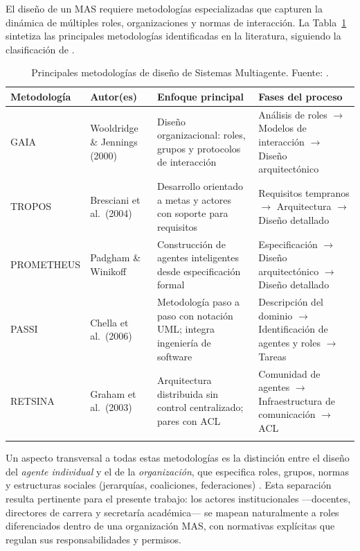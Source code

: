El diseño de un MAS requiere metodologías especializadas que capturen la dinámica de múltiples roles, organizaciones y normas de interacción. La Tabla~\ref{tab:mas_metodologias} sintetiza las principales metodologías identificadas en la literatura, siguiendo la clasificación de \citet{perez2022breve}.

\begin{table}[htb]
\centering
\small
\setlength{\extrarowheight}{4pt}
\caption{Principales metodologías de diseño de Sistemas Multiagente. Fuente: \citet{perez2022breve}.}
\label{tab:mas_metodologias}
\begin{tabularx}{\textwidth}{p{2.2cm}p{2.8cm}XX}
\toprule
\textbf{Metodología} & \textbf{Autor(es)} & \textbf{Enfoque principal} & \textbf{Fases del proceso} \\
\midrule
GAIA      & Wooldridge \& Jennings (2000)     & Diseño organizacional: roles, grupos y protocolos de interacción          & Análisis de roles $\to$ Modelos de interacción $\to$ Diseño arquitectónico \\
\arrayrulecolor{gray!35}\hline
TROPOS    & Bresciani et al.\ (2004)          & Desarrollo orientado a metas y actores con soporte para requisitos        & Requisitos tempranos $\to$ Arquitectura $\to$ Diseño detallado \\
\hline
PROMETHEUS & Padgham \& Winikoff               & Construcción de agentes inteligentes desde especificación formal          & Especificación $\to$ Diseño arquitectónico $\to$ Diseño detallado \\
\hline
PASSI     & Chella et al.\ (2006)             & Metodología paso a paso con notación UML; integra ingeniería de software  & Descripción del dominio $\to$ Identificación de agentes y roles $\to$ Tareas \\
\hline
RETSINA   & Graham et al.\ (2003)             & Arquitectura distribuida sin control centralizado; pares con ACL          & Comunidad de agentes $\to$ Infraestructura de comunicación $\to$ ACL \\
\arrayrulecolor{black}\bottomrule
\end{tabularx}
\end{table}

Un aspecto transversal a todas estas metodologías es la distinción entre el diseño del \emph{agente individual} y el de la \emph{organización}, que especifica roles, grupos, normas y estructuras sociales (jerarquías, coaliciones, federaciones) \citep{perez2022breve}. Esta separación resulta pertinente para el presente trabajo: los actores institucionales ---docentes, directores de carrera y secretaría académica--- se mapean naturalmente a roles diferenciados dentro de una organización MAS, con normativas explícitas que regulan sus responsabilidades y permisos.

